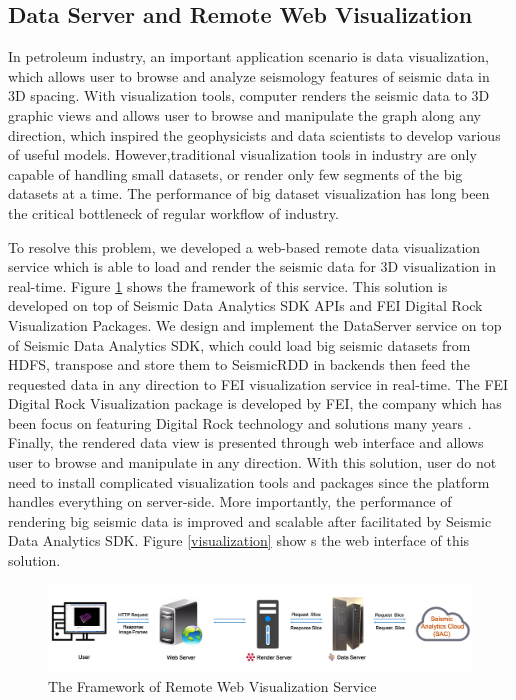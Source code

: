 \subsection{Data Server and Remote Web Visualization}

In petroleum industry, an important application scenario is data visualization, which allows user to browse and analyze seismology features of seismic data in 3D spacing. With visualization tools, computer renders the seismic data to 3D graphic views and allows user to browse and manipulate the graph along any direction, which inspired the geophysicists and data scientists to develop various of useful models. However,traditional visualization tools in industry are only capable of handling small datasets, or render only few segments of the big datasets at a time. The performance of  big dataset visualization has long been the critical bottleneck of regular workflow of industry.

To resolve this problem, we developed a web-based remote data visualization service which is able to load and render the seismic data for 3D visualization in real-time. Figure \ref{visualization_framework} shows the framework of this service. This solution is developed on top of Seismic Data Analytics SDK APIs and FEI Digital Rock Visualization Packages. We design and implement the DataServer service on top of Seismic Data Analytics SDK, which could load big seismic datasets from HDFS, transpose and store them to SeismicRDD in backends then feed the requested data in any direction to FEI visualization service in real-time. The FEI Digital Rock Visualization package is developed by FEI, the company which has been focus on featuring Digital Rock technology and solutions many years \cite{FEICompany}. Finally, the rendered data view is presented through web interface and allows user to browse and manipulate in any direction. With this solution, user do not need to install complicated visualization tools and packages since the platform handles everything on server-side. More importantly, the performance of rendering big seismic data is improved and scalable after facilitated by Seismic Data Analytics SDK. Figure \ref{visualization} show s the web interface of this solution.

\begin{figure}[h]
\centering
\includegraphics[scale=0.3]{figures/visualization_framework.png}
\caption{The Framework of Remote Web Visualization Service}
\label{visualization_framework}
\end{figure}

